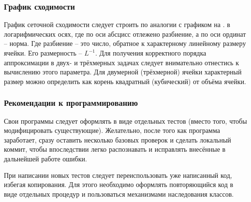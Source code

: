 \subsubsection{График сходимости}
График сеточной сходимости следует строить по аналогии с графиком на .
в логарифмических осях, где по оси абсцисс отлежено разбиение, а по оси ординат -- норма.
Где разбиение -- это число, обратное к характерному линейному размеру ячейки. Его размерность -- $L^{-1}$.
Для получения корректного порядка аппроксимации в двух- и трёхмерных задачах следует внимательно отнестись к вычислению этого параметра.
Для двумерной (трёхмерной) ячейки характерный размер можно определить как корень квадратный (кубический) от объёма ячейки.

\subsubsection{Рекомендации к программированию}
Свои программы следует оформлять в виде отдельных тестов (вместо того, чтобы модифицировать существующие).
Желательно, после того как программа заработает, сразу оставить несколько базовых  проверок и
сделать локальный коммит, чтобы впоследствии легко распознавать и исправлять внесённые в дальнейшей работе ошибки.

При написании новых тестов следует переиспользовать уже написанный код, избегая копирования.
Для этого необходимо оформлять повторяющийся код в виде отдельных процедур и пользоваться механизмами наследования классов.
